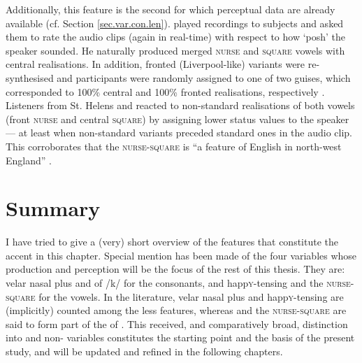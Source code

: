 Additionally, this feature is the second for which perceptual data are already available (cf. Section \ref{sec.var.con.len}).
\textcite{watsonclark2013} played recordings to subjects and asked them to rate the audio clips (again in real-time) with respect to how `posh' the speaker sounded.
He naturally produced merged \textsc{nurse} and \textsc{square} vowels with central realisations.
In addition, fronted (Liverpool-like) variants were re-synthesised and participants were randomly assigned to one of two guises, which corresponded to 100\% central and 100\% fronted realisations, respectively \parencite[cf.][305--306]{watsonclark2013}.
Listeners from St. Helens and  reacted to non-standard realisations of both vowels (front \textsc{nurse} and central \textsc{square}) by assigning lower status values to the speaker --- at least when non-standard variants preceded standard ones in the audio clip.
This corroborates that the \textsc{nurse}-\textsc{square}  is ``a  feature of English in north-west England'' \parencite[cf.][317--320]{watsonclark2013}.

	\section{Summary}

I have tried to give a (very) short overview of the features that constitute the  accent in this chapter.
Special mention has been made of the four variables whose production and perception will be the focus of the rest of this thesis.
They are: velar nasal plus and  of /k/ for the consonants, and happ\textsc{y}-tensing and the \textsc{nurse}-\textsc{square}  for the vowels.
In the literature, velar nasal plus and happ\textsc{y}-tensing are (implicitly) counted among the less  features, whereas  and the \textsc{nurse}-\textsc{square}  are said to form part of the  of .
This received, and comparatively broad, distinction into  and non- variables constitutes the starting point and the basis of the present study, and will be updated and refined in the following chapters.